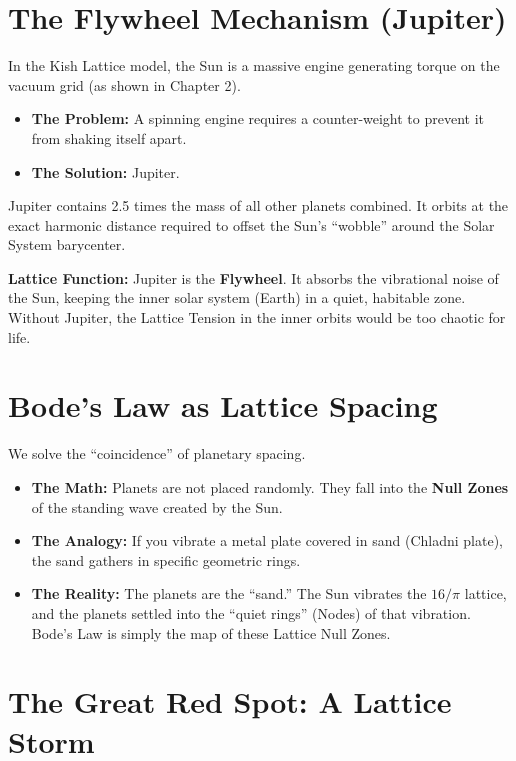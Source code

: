 \documentclass[11pt, letterpaper, openany]{book}
\begin{document}
\section{The Flywheel Mechanism (Jupiter)}

In the Kish Lattice model, the Sun is a massive engine generating torque on the vacuum
grid (as shown in Chapter 2).

\begin{itemize}
    \item \textbf{The Problem:} A spinning engine requires a counter-weight to prevent it from
    shaking itself apart.
    \item \textbf{The Solution:} Jupiter.
\end{itemize}

Jupiter contains 2.5 times the mass of all other planets combined. It orbits at the exact
harmonic distance required to offset the Sun’s “wobble” around the Solar System
barycenter.

\medskip

\noindent\textbf{Lattice Function:} Jupiter is the \textbf{Flywheel}. It absorbs the vibrational noise of
the Sun, keeping the inner solar system (Earth) in a quiet, habitable zone. Without
Jupiter, the Lattice Tension in the inner orbits would be too chaotic for life.

\section{Bode’s Law as Lattice Spacing}

We solve the “coincidence” of planetary spacing.

\begin{itemize}
    \item \textbf{The Math:} Planets are not placed randomly. They fall into the \textbf{Null Zones}
    of the standing wave created by the Sun.
    \item \textbf{The Analogy:} If you vibrate a metal plate covered in sand (Chladni plate), the
    sand gathers in specific geometric rings.
    \item \textbf{The Reality:} The planets are the “sand.” The Sun vibrates the $16/\pi$ lattice,
    and the planets settled into the “quiet rings” (Nodes) of that vibration. Bode’s Law
    is simply the map of these Lattice Null Zones.
\end{itemize}

\section{The Great Red Spot: A Lattice Storm}
\end{document}
